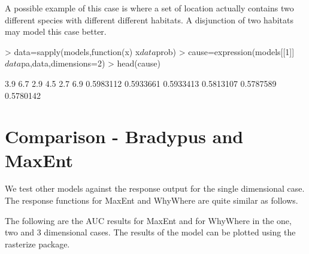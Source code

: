 \documentclass{article}
\begin{document}
A possible example of this case is where a set of location actually contains two different species with different different habitats.  A disjunction of two habitats may model this case better.

\begin{Schunk}
\begin{Sinput}
> data=sapply(models,function(x) x$data$prob)
> cause=expression(models[[1]]$data$pa,data,dimensions=2)
> head(cause)
\end{Sinput}
\begin{Soutput}
      3.9       6.7       2.9       4.5       2.7       6.9 
0.5983112 0.5933661 0.5933413 0.5813107 0.5787589 0.5780142 
\end{Soutput}
\end{Schunk}


\section{Comparison - Bradypus and MaxEnt}

We test other models against the response output for the single dimensional case.  The response functions for MaxEnt and WhyWhere are quite similar as follows.



The following are the AUC results for MaxEnt and for WhyWhere in the one, two and 3 dimensional cases. The results of the model can be plotted using the rasterize package.
\end{document}
